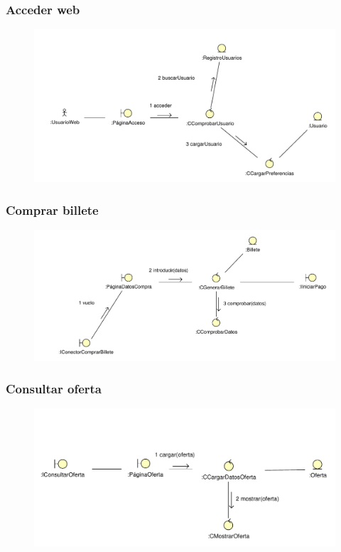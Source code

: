 \documentclass[11pt, a4paper, twoside, titlepage]{article}
\begin{document}
			\subsubsection{Acceder web}
				\begin{figure}[H]\centering
					\includegraphics[scale=.75]{diagramas/accederweb.pdf}
				\end{figure}

			\subsubsection{Comprar billete}
				\begin{figure}[H]\centering
					\includegraphics[scale=.72]{diagramas/comprarbillete.pdf}
				\end{figure}

			\subsubsection{Consultar oferta}
				\begin{figure}[H]\centering
					\includegraphics[scale=.85]{diagramas/consultaroferta.pdf}
				\end{figure}
\end{document}
